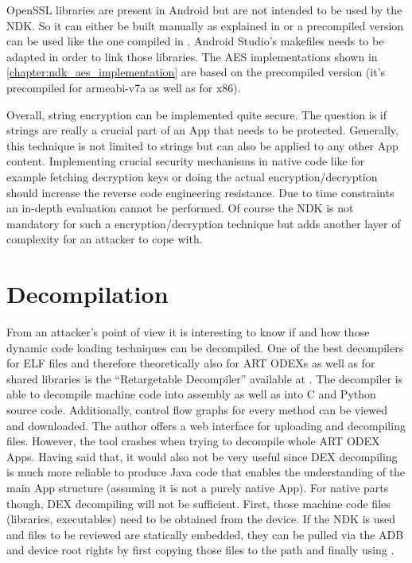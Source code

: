 OpenSSL libraries are present in Android but are
not intended to be used by the NDK. So it can either be built manually
as explained in \parencite{openssl_building} or a precompiled version
can be used like the one compiled in \parencite{openssl_precompiled}.
Android Studio's makefiles
needs to be adapted in order to link those libraries.
The AES implementations shown in \autoref{chapter:ndk_aes_implementation} are
based on the precompiled version (it's precompiled for armeabi-v7a as
well as for x86).

Overall, string encryption can be implemented quite secure. The question is
if strings are really a crucial part of an App that needs to be protected.
Generally, this technique is not limited to strings but can also
be applied to any other App content. Implementing crucial security mechanisms in native code like for example fetching decryption keys or doing the actual encryption/decryption should increase the reverse code engineering resistance. Due to time constraints an in-depth evaluation cannot be performed. Of course the NDK is not
mandatory for such a encryption/decryption technique but adds another
layer of complexity for an attacker to cope with.

\section{Decompilation}\label{section:decompilation}
From an attacker's point of view it is interesting to know if and how
those dynamic code loading techniques can be decompiled.
One of the best decompilers for ELF files and therefore
theoretically also for ART ODEXs as well as for shared libraries is the
``Retargetable Decompiler'' available at \parencite{retdec}.
The decompiler is able to decompile machine code into assembly as
well as into C and Python source code.
Additionally, control flow graphs for every method can be viewed and downloaded.
The author offers a web interface for uploading and decompiling
files. However, the tool crashes when trying to
decompile whole ART ODEX Apps. Having said that, it would
also not be very useful since DEX decompiling
is much more reliable to produce Java code that enables the understanding
of the main App structure (assuming it is not a purely native App).
For native parts though, DEX decompiling will not be sufficient.
First, those machine code files (libraries, executables) need to
be obtained from the device. If the NDK is used and files to be
reviewed are statically embedded, they can be pulled via the ADB
and device root rights by first copying those files to the 
path and finally using .

